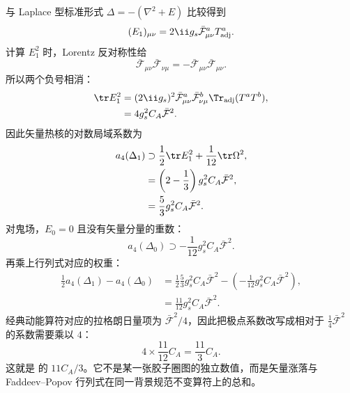 \begin{derivation}[胶子与鬼场的一圈紫外系数]
与 Laplace 型标准形式 $\Delta=-(\nabla^2+E)$ 比较得到
\begin{equation*}
 (E_1)_{\mu\nu}
 =2\ii g_s\bar{\mathcal F}_{\mu\nu}^aT_{\rm adj}^a.
\end{equation*}
计算 $E_1^2$ 时，Lorentz 反对称性给
\begin{equation*}
 \bar{\mathcal F}_{\mu\nu}\bar{\mathcal F}_{\nu\mu}
 =-\bar{\mathcal F}_{\mu\nu}\bar{\mathcal F}_{\mu\nu}.
\end{equation*}
所以两个负号相消：
\begin{align*}
 \tr E_1^2
 &=(2\ii g_s)^2
 \bar{\mathcal F}_{\mu\nu}^a\bar{\mathcal F}_{\nu\mu}^b
 \Tr_{\rm adj}(T^aT^b),\\
 &=4g_s^2C_A\bar{\mathcal F}^2.
\end{align*}
因此矢量热核的对数局域系数为
\begin{align*}
 a_4(\Delta_1)
 &\supset
 \frac12\tr E_1^2+\frac1{12}\tr\Omega^2,\\
 &=\left(2-\frac13\right)g_s^2C_A\bar{\mathcal F}^2,\\
 &=\frac53g_s^2C_A\bar{\mathcal F}^2.
\end{align*}
对鬼场，$E_0=0$ 且没有矢量分量的重数：
\begin{equation*}
 a_4(\Delta_0)
 \supset-\frac1{12}g_s^2C_A\bar{\mathcal F}^2.
\end{equation*}
再乘上行列式对应的权重：
\begin{align*}
 \frac12a_4(\Delta_1)-a_4(\Delta_0)
 &=\frac12\frac53g_s^2C_A\bar{\mathcal F}^2
 -\left(-\frac1{12}g_s^2C_A\bar{\mathcal F}^2\right),\\
 &=\frac{11}{12}g_s^2C_A\bar{\mathcal F}^2.
\end{align*}
经典动能算符对应的拉格朗日量项为 $\bar{\mathcal F}^2/4$，因此把极点系数改写成相对于 $\frac14\bar{\mathcal F}^2$ 的系数需要乘以 $4$：
\begin{equation*}
 {4\times\frac{11}{12}C_A=\frac{11}{3}C_A.}
\end{equation*}
这就是  的 $11C_A/3$。它不是某一张胶子圈图的独立数值，而是矢量涨落与 Faddeev--Popov 行列式在同一背景规范不变算符上的总和。
\end{derivation}

